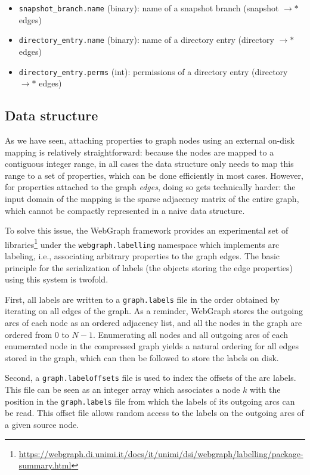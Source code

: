 \begin{itemize}
    \setlength\itemsep{0em}
\item \texttt{snapshot\_branch.name} (binary): name of a snapshot branch
    (snapshot $\to\ast$ edges)
\item \texttt{directory\_entry.name} (binary): name of a directory entry
    (directory $\to\ast$ edges)
\item \texttt{directory\_entry.perms} (int): permissions of a directory
    entry (directory $\to\ast$ edges)
\end{itemize}

\subsection{Data structure}%
\label{sec:label-data-structure}

As we have seen, attaching properties to graph nodes using an external
on-disk mapping is relatively straightforward: because the nodes are mapped to
a contiguous integer range, in all cases the data structure only needs to map
this range to a set of properties, which can be done efficiently in most cases.
However, for properties attached to the graph \emph{edges}, doing so gets
technically harder: the input domain of the mapping is the sparse adjacency
matrix of the entire graph, which cannot be compactly represented in a naive
data structure.

To solve this issue, the WebGraph framework provides an experimental set of
libraries\footnote{\url{https://webgraph.di.unimi.it/docs/it/unimi/dsi/webgraph/labelling/package-summary.html}}
under the \texttt{webgraph.labelling} namespace which implements arc labeling,
i.e., associating arbitrary properties to the graph edges. The basic principle
for the serialization of labels (the objects storing the edge properties) using
this system is twofold.

First, all labels are written to a \texttt{graph.labels} file in the order
obtained by iterating on all edges of the graph.  As a reminder, WebGraph
stores the outgoing arcs of each node as an ordered adjacency list, and all the
nodes in the graph are ordered from $0$ to $N-1$.  Enumerating all nodes
and all outgoing arcs of each enumerated node in the compressed graph
yields a natural ordering for all edges stored in the graph, which can then be
followed to store the labels on disk.

Second, a \texttt{graph.labeloffsets} file is used to index the offsets of the
arc labels. This file can be seen as an integer array which associates a node
$k$ with the position in the \texttt{graph.labels} file from which the labels
of its outgoing arcs can be read. This offset file allows random access to the
labels on the outgoing arcs of a given source node.

